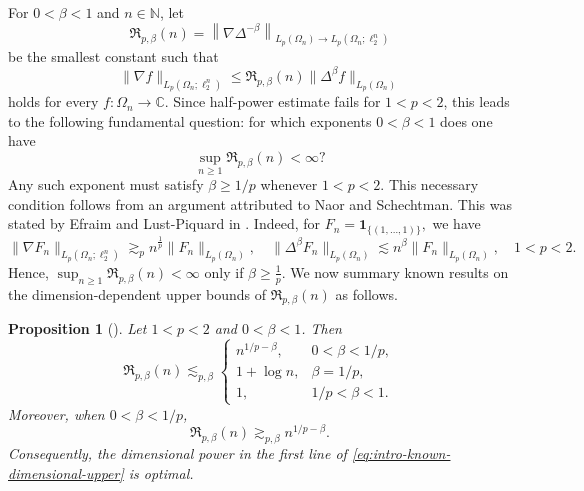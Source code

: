\documentclass{amsart}
\numberwithin{equation}{section}
\newtheorem{prop}[thm]{Proposition}
\theoremstyle{definition}
\theoremstyle{remark}
\newcommand{\1}{\mathbf 1}
\begin{document}
\noindent For $0<\beta<1$ and $n\in\mathbb N$, let
\[
\mathfrak R_{p,\beta}(n)=\left\|\nabla\Delta^{-\beta}\right\|_{L_{p}(\Omega_{n})\to L_{p}(\Omega_{n};\ell_{2}^{n})}
\]
be  the smallest constant such that
\[
 \|\nabla f\|_{L_{p}(\Omega_{n};\ell_{2}^{n})} \leq\mathfrak R_{p,\beta}(n)\|\Delta^{\beta}f\|_{L_{p}(\Omega_{n})}
\]
holds for every $f:\Omega_{n}\to\mathbb C$. Since half-power estimate fails for $1<p<2$, this leads to the following fundamental question: for which exponents $0<\beta<1$ does one have 
\[
\sup_{n\geq1}\mathfrak R_{p,\beta}(n)<\infty?
\]
Any such exponent must satisfy $\beta\geq1/p$ whenever $1<p<2$. This necessary condition follows from an argument attributed to Naor and Schechtman. This was stated by Efraim and Lust-Piquard in \cite[Lemma 5.5]{E-LP2008}. Indeed, for $F_n=\1_{\{(1,\ldots,1)\}},$ we have
\[
\|\nabla F_n\|_{L_p(\Omega_n;\ell_2^n)}\gtrsim_p n^{\frac1p}\|F_n\|_{L_p(\Omega_n)},\quad \|\Delta^{\beta} F_n\|_{L_p(\Omega_n)}\lesssim n^{\beta}\|F_n\|_{L_p(\Omega_n)},\quad 1<p<2.
\]
Hence, $\sup_{n\geq1}\mathfrak{R}_{p,\beta}(n)<\infty$ only if $\beta\geq\frac{1}{p}$. We now summary known results on the dimension-dependent upper bounds of $\mathfrak R_{p,\beta}(n)$ as follows.
\begin{prop}[\cite{E-LP2008, IVHV2020}]\label{prop:intro-known-dimensional}
Let $1<p<2$ and $0<\beta<1$.  Then
\begin{equation}\label{eq:intro-known-dimensional-upper}
 \mathfrak R_{p,\beta}(n)
 \lesssim_{p,\beta}
 \begin{cases}
  n^{1/p-\beta},
     &0<\beta<1/p,\\[2mm]
  1+\log n,
     &\beta=1/p,\\[2mm]
  1,
     &1/p<\beta<1.
 \end{cases}
\end{equation}
Moreover, when $0<\beta<1/p$,
\begin{equation}\label{eq:intro-known-dimensional-lower}
 \mathfrak R_{p,\beta}(n)
 \gtrsim_{p,\beta}
 n^{1/p-\beta}.
\end{equation}
Consequently, the dimensional power in the first line of
\eqref{eq:intro-known-dimensional-upper} is optimal.
\end{prop}
\end{document}
